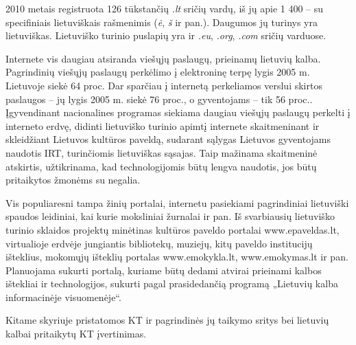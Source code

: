 \begin{multicols}{2}

2010 metais registruota 126 tūkstančių \textit{.lt} sričių vardų, iš jų apie 1 400 –  su specifiniais lietuviškais rašmenimis (\textit{ė}, \textit{š} ir pan.). Daugumos jų turinys yra lietuviškas. Lietuviško turinio puslapių yra ir \textit{.eu}, \textit{.org}, \textit{.com} sričių varduose.   


 Internete vis daugiau atsiranda viešųjų paslaugų, prieinamų lietuvių kalba. Pagrindinių viešųjų paslaugų perkėlimo į elektroninę terpę lygis 2005 m. Lietuvoje siekė 64 proc. Dar sparčiau į internetą perkeliamos verslui skirtos paslaugos – jų lygis 2005 m. siekė 76 proc., o gyventojams – tik 56 proc.\cite{esparama}.  Įgyvendinant nacionalines programas siekiama daugiau viešųjų paslaugų perkelti į interneto erdvę, didinti lietuviško turinio apimtį internete skaitmeninant ir skleidžiant Lietuvos kultūros paveldą, sudarant sąlygas Lietuvos gyventojams naudotis IRT, turinčiomis lietuviškas sąsajas. Taip mažinama skaitmeninė atskirtis, užtikrinama, kad technologijomis būtų lengva naudotis, jos būtų pritaikytos žmonėms su negalia.   

   Vis populiaresni tampa žinių portalai, internetu pasiekiami pagrindiniai lietuviški spaudos leidiniai, kai kurie moksliniai žurnalai ir pan. Iš svarbiausių lietuviško turinio sklaidos projektų minėtinas kultūros paveldo portalai www.epaveldas.lt, virtualioje erdvėje jungiantis bibliotekų, muziejų, kitų paveldo institucijų išteklius, mokomųjų išteklių portalas www.emokykla.lt, www.emokymas.lt ir pan. Planuojama sukurti portalą, kuriame būtų dedami atvirai prieinami kalbos ištekliai ir technologijos, sukurti pagal prasidedančią programą „Lietuvių kalba informacinėje visuomenėje“.  

Kitame skyriuje pristatomos KT ir pagrindinės jų taikymo sritys bei lietuvių kalbai pritaikytų KT įvertinimas.

\end{multicols}

\clearpage


